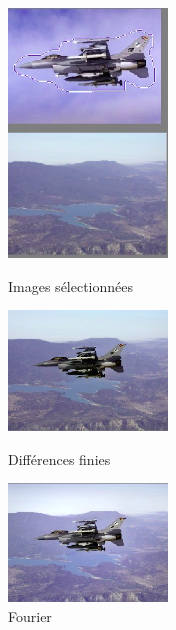 \begin{figure}[!htb]
   \begin{minipage}{0.33\textwidth}
     \centering
     \includegraphics[width = 120pt]{Images/Resultats/avionlac.png}
     \caption{Images sélectionnées}
      \end{minipage}\hfill
   \begin{minipage}{0.33\textwidth}
     \centering
     \includegraphics[width = 120pt]{Images/Resultats/avion.png}
     \caption{Différences finies}
      \end{minipage}\hfill
   \begin{minipage}{0.33\textwidth}
     \centering
     \includegraphics[width= 120pt]{Images/Resultats/avionFourier.png}
     \caption{Fourier}
   \end{minipage}
\end{figure}
